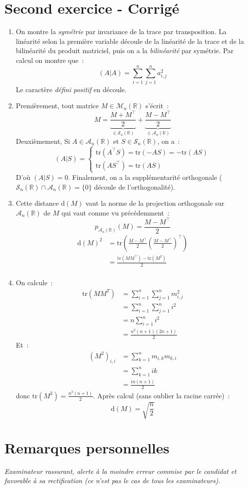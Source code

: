\documentclass[11pt]{article}
\newcommand{\R}{\mathbb{R}}
\begin{document}
\section*{Second exercice - Corrigé}
\begin{enumerate}[label=\textbf{\arabic*.}]
    \item On montre la \textit{symétrie} par invariance de la trace par transposition. La linéarité selon la première variable découle de la linéarité de la trace et de la bilinéarité du produit matriciel, puis on a la \textit{bilinéarité} par symétrie. Par calcul on montre que~:
    $$(A\vert A) = \sum_{i=1}^n \sum_{j=1}^n a_{i,j}^2$$
    Le caractère \textit{défini positif} en découle.
    \item Premièrement, tout matrice $M \in \mathcal{M}_n(\R)$ s'écrit~:
    $$M = \underbrace{\frac{M + M^\top}{2}}_{\in \mathcal{S}_n(\R)} + \underbrace{\frac{M - M^\top}{2}}_{\in \mathcal{A}_n(\R)}$$
    Deuxièmement, Si $A \in \mathcal{A}_n(\R)$ et $S \in \mathcal{S}_n(\R)$, on a~:
    $$(A\vert S) = \begin{cases}
        \mathrm{tr}(A^\top S) = \mathrm{tr}(-AS) = -\mathrm{tr}(AS)\\
        \mathrm{tr}(AS^\top) = \mathrm{tr}(AS)
    \end{cases} $$ 
    D'où $(A \vert S) = 0$.
    Finalement, on a la supplémentarité orthogonale ($\mathcal{S}_n(\R) \cap \mathcal{A}_n(\R) = \{0\}$ découle de l'orthogonalité).
    \item Cette distance $\mathrm{d}(M)$ vaut la norme de la projection orthogonale sur $\mathcal{A}_n(\R)$ de $M$ qui vaut comme vu précédemment~:
    $$p_{\mathcal{A}_n(\R)}(M) = \frac{M-M^\top}{2}$$
    \begin{align*}
        \mathrm{d}(M)^2 &= \mathrm{tr}\left(\frac{M-M^\top}{2} \left(\frac{M-M^\top}{2}\right)^\top\right)\\
        &= \frac{\mathrm{tr}(MM^\top) - \mathrm{tr}(M^2)}{2}\\
    \end{align*}
    \item On calcule~:
    \begin{align*}
        \mathrm{tr}(MM^T) &= \sum_{i=1}^n \sum_{j=1}^n m_{i,j}^2\\
        &= \sum_{i=1}^n \sum_{j=1}^n i^2\\
        &= n \sum_{i=1}^n i^2\\
        &= \frac{n^2 (n+1) (2n+1)}{2}
    \end{align*}
    Et~:
    \begin{align*}
        (M^2)_{i,i} &= \sum_{k=1}^n m_{i,k} m_{k,i}\\
        &= \sum_{k=1}^n ik\\
        &= \frac{in(n+1)}{2}
    \end{align*}
    donc $\displaystyle \mathrm{tr}(M^2) = \frac{n^2(n+1)}{2}$. Après calcul (sans oublier la racine carrée)~:
    $$\mathrm{d}(M) = \sqrt{\frac{n}{2}}$$
\end{enumerate}

\vspace{1cm}

\section*{Remarques personnelles}
\textit{Examinateur rassurant, alerte à la moindre erreur commise par le candidat et favorable à sa rectification (ce n'est pas le cas de tous les examinateurs).}
\end{document}
